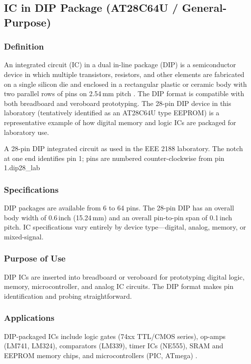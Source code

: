 \subsection{IC in DIP Package (AT28C64U / General-Purpose)}

\subsubsection*{Definition}
An integrated circuit (IC) in a dual in-line package (DIP) is a semiconductor device
in which multiple transistors, resistors, and other elements are fabricated on a single
silicon die and enclosed in a rectangular plastic or ceramic body with two parallel rows
of pins on 2.54\,mm pitch \cite{sedra2020}. The DIP format is compatible with both
breadboard and veroboard prototyping. The 28-pin DIP device in this laboratory
(tentatively identified as an AT28C64U type EEPROM) is a representative example of how
digital memory and logic ICs are packaged for laboratory use.

%
  {A 28-pin DIP integrated circuit as used in the EEE 2188 laboratory.
   The notch at one end identifies pin 1; pins are numbered
   counter-clockwise from pin 1.}{dip28_lab}

\subsubsection*{Specifications}
DIP packages are available from 6 to 64 pins. The 28-pin DIP has an overall body width
of 0.6\,inch (15.24\,mm) and an overall pin-to-pin span of 0.1\,inch pitch. IC
specifications vary entirely by device type---digital, analog, memory, or mixed-signal.

\subsubsection*{Purpose of Use}
DIP ICs are inserted into breadboard or veroboard for prototyping digital logic, memory,
microcontroller, and analog IC circuits. The DIP format makes pin identification and
probing straightforward.

\subsubsection*{Applications}
DIP-packaged ICs include logic gates (74xx TTL/CMOS series), op-amps (LM741, LM324),
comparators (LM339), timer ICs (NE555), SRAM and EEPROM memory chips, and
microcontrollers (PIC, ATmega) \cite{sedra2020}.
